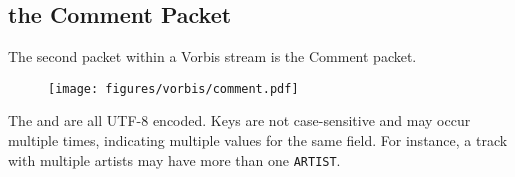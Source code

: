 \clearpage

\subsection{the Comment Packet}
\label{vorbiscomment}
The second packet within a Vorbis stream is the Comment packet.

\begin{figure}[h]
\texttt{[image: figures/vorbis/comment.pdf]}
\end{figure}

The  and  are all UTF-8 encoded.
Keys are not case-sensitive and may occur multiple times,
indicating multiple values for the same field.
For instance, a track with multiple artists may have
more than one \texttt{ARTIST}.

